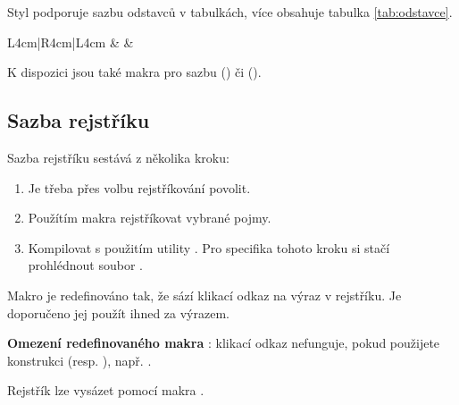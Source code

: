 \documentclass[
  master=false,               %
  font=sans,                  %
  printversion=false,         %
  joinlists=true,             %
  glossaries=true,            %
  figures=true,               %
  tables=true,                %
  sourcecodes=true,					  %
  theorems=true,						  %
  bibencoding=utf8,           %
  language=czech,             %
  encoding=utf8,              %
  field=inf,                  %
  index=true,                 %
]{updiplom}
\begin{document}
Styl podporuje sazbu odstavců v tabulkách, více obsahuje tabulka \ref{tab:odstavce}.

\begin{table}
\begin{center}
\caption{Seznam přepínačů}\label{tab:odstavce}
\begin{tabular}{L{4cm}|R{4cm}|L{4cm}}
\lipsum[23] & \lipsum[22] & \lipsum[21]
\end{tabular}
\end{center}
\end{table}

K dispozici jsou také makra pro sazbu \csharp{} () či \cpp{} ().

\subsection{Sazba rejstříku}
Sazba rejstříku sestává z několika kroku:

\begin{enumerate}
\item Je třeba přes volbu  rejstříkování povolit.
\item Použítím makra  rejstříkovat vybrané pojmy.
\item Kompilovat s použitím utility . Pro specifika tohoto kroku si stačí prohlédnout soubor .
\end{enumerate}

Makro  je redefinováno tak, že sází klikací odkaz na výraz v rejstříku. Je doporučeno jej použít ihned za výrazem.

\textbf{Omezení redefinovaného makra }: klikací odkaz nefunguje, pokud použijete konstrukci  (resp. ), např. .
  
Rejstřík lze vysázet pomocí makra .
\end{document}
